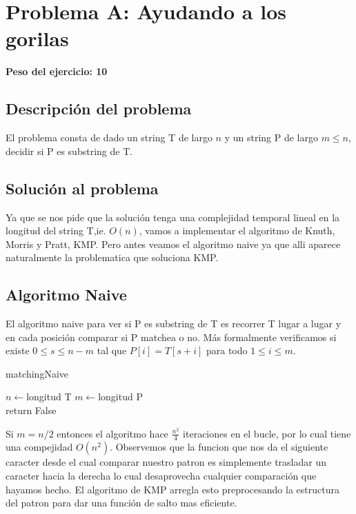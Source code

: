 \newpage{}
\section{Problema A: Ayudando a los gorilas}
\textbf{Peso del ejercicio: 10}
\subsection{Descripción del problema}
	El problema consta de dado un string T de largo $n$ y un string P de 
	largo $m\leq n$, decidir si P es substring de T.
	
\subsection{Solución al problema}
	Ya que se nos pide que la soluci\'on tenga una complejidad temporal
	lineal en la longitud del string T,ie. $O(n)$, vamos a implementar el algoritmo
	de Knuth, Morris y Pratt, KMP. Pero antes veamos el algoritmo naive
	ya que alli aparece naturalmente la problematica que soluciona KMP.
	
\subsection{Algoritmo Naive}
	El algoritmo naive para ver si P es substring de T es recorrer
	T lugar a lugar y en cada posici\'on comparar si P matchea o no. M\'as
	formalmente verificamos si existe $0\leq s \leq n-m$ tal que 
	$P[i]=T[s+i]$ para todo $1\leq i \leq m$.
	
	\incmargin{1em}
	\linesnumbered
	\begin{algorithm}
		\caption{matchingNaive}
		\BlankLine
	
		$n\leftarrow$longitud T\;
		$m\leftarrow$longitud P\\
		return False\;
	\end{algorithm}
	\decmargin{1em}
	
	
	Si $m=n/2$ entonces el algoritmo hace $\frac{n^2}{4}$ iteraciones
	en el bucle, por lo cual tiene una compejidad $O(n^2)$. Observemos
	que la funcion que nos da el siguiente caracter desde el cual
	comparar nuestro patron es simplemente trasladar un caracter hacia
	la derecha lo cual desaprovecha cualquier comparaci\'on que hayamos
	hecho. El algoritmo de KMP arregla esto preprocesando 
	la estructura del patron para dar una funci\'on de salto mas eficiente.


